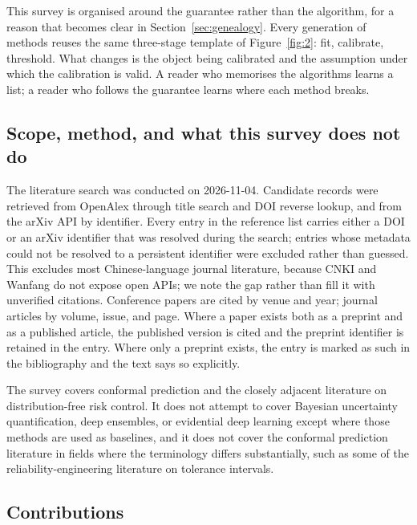\documentclass[a4paper,longmktitle]{cas-sc}
\begin{document}
This survey is organised around the guarantee rather than the algorithm, for a reason that becomes clear in Section~\ref{sec:genealogy}. Every generation of methods reuses the same three-stage template of Figure~\ref{fig:2}: fit, calibrate, threshold. What changes is the object being calibrated and the assumption under which the calibration is valid. A reader who memorises the algorithms learns a list; a reader who follows the guarantee learns where each method breaks.

\subsection{Scope, method, and what this survey does not do}

The literature search was conducted on 2026-11-04. Candidate records were retrieved from OpenAlex through title search and DOI reverse lookup, and from the arXiv API by identifier. Every entry in the reference list carries either a DOI or an arXiv identifier that was resolved during the search; entries whose metadata could not be resolved to a persistent identifier were excluded rather than guessed. This excludes most Chinese-language journal literature, because CNKI and Wanfang do not expose open APIs; we note the gap rather than fill it with unverified citations. Conference papers are cited by venue and year; journal articles by volume, issue, and page. Where a paper exists both as a preprint and as a published article, the published version is cited and the preprint identifier is retained in the entry. Where only a preprint exists, the entry is marked as such in the bibliography and the text says so explicitly.

The survey covers conformal prediction and the closely adjacent literature on distribution-free risk control. It does not attempt to cover Bayesian uncertainty quantification, deep ensembles, or evidential deep learning except where those methods are used as baselines, and it does not cover the conformal prediction literature in fields where the terminology differs substantially, such as some of the reliability-engineering literature on tolerance intervals.

\subsection{Contributions}
\end{document}
